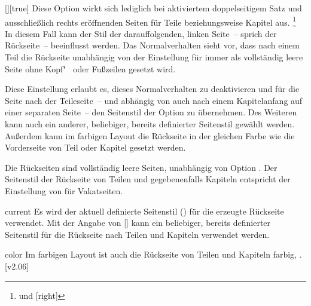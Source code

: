 \begin{Declaration}{[\PSet]}[true]%
\printdeclarationlist%
%
%
%
%
Diese Option wirkt sich lediglich bei aktiviertem doppelseitigem Satz und 
ausschließlich rechts eröffnenden Seiten für Teile beziehungsweise Kapitel
aus.%
\footnote{ und [right]}
In diesem Fall kann der Stil der darauffolgenden, linken Seite~-- sprich der 
Rückseite~-- beeinflusst werden. Das Normalverhalten sieht vor, dass nach einem 
Teil die Rückseite unabhängig von der Einstellung für  
immer als vollständig leere Seite ohne Kopf"~ oder Fußzeilen gesetzt wird.

Diese Einstellung erlaubt es, dieses Normalverhalten zu deaktivieren und für 
die Seite nach der Teileseite~-- und abhängig von  
auch nach einem Kapitelanfang auf einer separaten Seite~-- den Seitenstil der 
Option  zu übernehmen. Des Weiteren kann auch ein 
anderer, beliebiger, bereits definierter Seitenstil gewählt werden. Außerdem
kann im farbigen Layout die Rückseite in der gleichen Farbe wie die 
Vorderseite von Teil oder Kapitel gesetzt werden. \notudscrartcl
%
\begin{values}
\itemfalse
  Die Rückseiten sind vollständig leere Seiten, unabhängig von Option
  .
\itemtrue*
  Der Seitenstil der Rückseite von Teilen und gegebenenfalls Kapiteln 
  entspricht der Einstellung von  für Vakatseiten.
\item[current]
  Es wird der aktuell definierte Seitenstil () für die 
  erzeugte Rückseite verwendet.
  Mit der Angabe von [] 
  kann ein beliebiger, bereits definierter Seitenstil für die Rückseite nach 
  Teilen und Kapiteln verwendet werden.
\item[color]
  Im farbigen Layout ist auch die Rückseite von Teilen und Kapiteln farbig, 
  .
[v2.06]
\end{values}
\end{Declaration}

